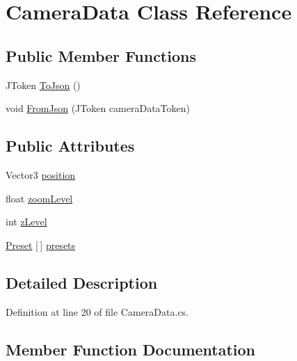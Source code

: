 \hypertarget{class_camera_data}{}\section{Camera\+Data Class Reference}
\label{class_camera_data}
\subsection*{Public Member Functions}
\begin{DoxyCompactItemize}
\item 
J\+Token \hyperlink{class_camera_data_a8d13351ec9d2955cd702be0f77b1be50}{To\+Json} ()
\item 
void \hyperlink{class_camera_data_a1e0c8e3959bb5dd3bb9a8519f5f9af68}{From\+Json} (J\+Token camera\+Data\+Token)
\end{DoxyCompactItemize}
\subsection*{Public Attributes}
\begin{DoxyCompactItemize}
\item 
Vector3 \hyperlink{class_camera_data_ad52c2b17d55ce14f104d710b4816d807}{position}
\item 
float \hyperlink{class_camera_data_a7045f0bec85d0a84c6bc72bfdfafedb8}{zoom\+Level}
\item 
int \hyperlink{class_camera_data_aa41bab97e035b11732452f0b2b19f0d4}{z\+Level}
\item 
\hyperlink{struct_preset}{Preset} \mbox{[}$\,$\mbox{]} \hyperlink{class_camera_data_ade368787d30a145ccb9bcf3fd64c5bfb}{presets}
\end{DoxyCompactItemize}


\subsection{Detailed Description}


Definition at line 20 of file Camera\+Data.\+cs.



\subsection{Member Function Documentation}
\mbox{\label{class_camera_data_a1e0c8e3959bb5dd3bb9a8519f5f9af68}} 
